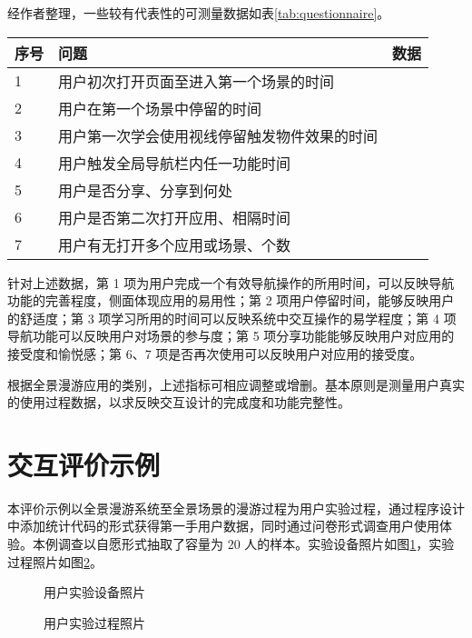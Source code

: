 经作者整理，一些较有代表性的可测量数据如表\ref{tab:questionnaire}。

\begin{table}[htbp]
\centering
{}
\vskip 5pt
\begin{tabular}{lll}
\toprule
序号 & 问题 & 数据 \\
\midrule
1 & 用户初次打开页面至进入第一个场景的时间 & 	\\
2 &  用户在第一个场景中停留的时间 & \\
3 & 用户第一次学会使用视线停留触发物件效果的时间 & \\
4 & 用户触发全局导航栏内任一功能时间 & \\
5 & 用户是否分享、分享到何处 & \\
6 & 用户是否第二次打开应用、相隔时间 & \\
7 & 用户有无打开多个应用或场景、个数 & \\
\bottomrule
\end{tabular}
\label{tab:questionnaire2}
\end{table}

针对上述数据，第 1 项为用户完成一个有效导航操作的所用时间，可以反映导航功能的完善程度，侧面体现应用的易用性；第 2 项用户停留时间，能够反映用户的舒适度；第 3 项学习所用的时间可以反映系统中交互操作的易学程度；第 4 项导航功能可以反映用户对场景的参与度；第 5 项分享功能能够反映用户对应用的接受度和愉悦感；第 6、7 项是否再次使用可以反映用户对应用的接受度。

根据全景漫游应用的类别，上述指标可相应调整或增删。基本原则是测量用户真实的使用过程数据，以求反映交互设计的完成度和功能完整性。


\section{交互评价示例}

本评价示例以全景漫游系统至全景场景的漫游过程为用户实验过程，通过程序设计中添加统计代码的形式获得第一手用户数据，同时通过问卷形式调查用户使用体验。本例调查以自愿形式抽取了容量为 20 人的样本。实验设备照片如图\ref{fig:photo1}，实验过程照片如图\ref{fig:photo2}。


\begin{figure}[htp]
\centering
{}
\caption{用户实验设备照片}
\label{fig:photo1}
\end{figure}


\begin{figure}[htp]
\centering
\fbox{
  \texttt{[image: p1]}
}
\fbox{
  \texttt{[image: p2]}
}
\caption{用户实验过程照片}
\label{fig:photo2}
\end{figure}



